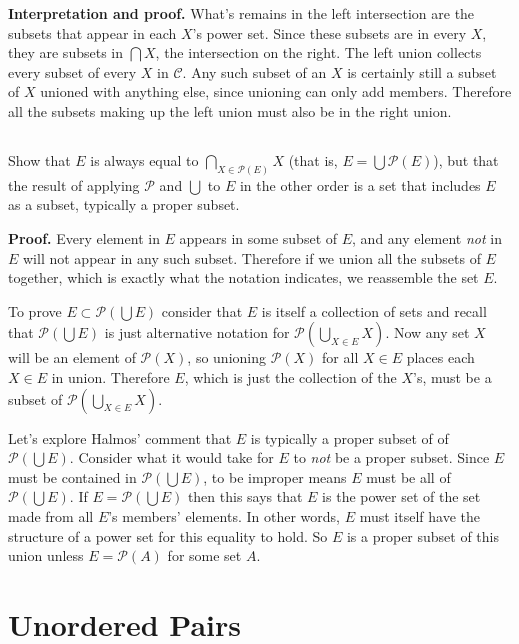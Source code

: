 \documentclass{article}
\begin{document}
\textbf{Interpretation and proof.} What's remains in the left intersection are the subsets that appear in each $X$'s power set. Since these subsets are in every $X$, they are subsets in $\bigcap X$, the intersection on the right. The left union collects every subset of every $X$ in $\mathcal{C}$. Any such subset of an $X$ is certainly still a subset of $X$ unioned with anything else, since unioning can only add members. Therefore all the subsets making up the left union must also be in the right union.

\subsection{} Show that $E$ is always equal to $\bigcap_{X \in \mathscr{P}(E)}X$ (that is, $E = \bigcup \mathscr{P}(E)$), but that the result of applying $\mathscr{P}$ and $\bigcup$ to $E$ in the other order is a set that includes $E$ as a subset, typically a proper subset.

\textbf{Proof.} Every element in $E$ appears in some subset of $E$, and any element \textit{not} in $E$ will not appear in any such subset. Therefore if we union all the subsets of $E$ together, which is exactly what the notation indicates, we reassemble the set $E$.

To prove $E \subset \mathscr{P}\left(\bigcup E\right)$ consider that $E$ is itself a collection of sets and recall that $\mathscr{P}\left(\bigcup E\right)$ is just alternative notation for $\mathscr{P}\left(\bigcup_{X \in E} X\right)$. Now any set $X$ will be an element of $\mathscr{P}(X)$, so unioning $\mathscr{P}(X)$ for all $X \in E$ places each $X \in E$ in union. Therefore $E$, which is just the collection of the $X$'s, must be a subset of $\mathscr{P}(\bigcup_{X \in E} X)$. 

Let's explore Halmos' comment that $E$ is typically a proper subset of of $\mathscr{P}\left(\bigcup E\right)$. Consider what it would take for $E$ to \textit{not} be a proper subset. Since $E$ must be contained in $\mathscr{P}\left(\bigcup E\right)$, to be improper means $E$ must be all of $\mathscr{P}\left(\bigcup E\right)$. If $E = \mathscr{P}\left(\bigcup E\right)$ then this says that $E$ is the power set of the set made from all $E$'s members' elements. In other words, $E$ must itself have the structure of a power set for this equality to hold. So $E$ is a proper subset of this union unless $E = \mathscr{P}(A)$ for some set $A$.

\section{Unordered Pairs}
\end{document}
